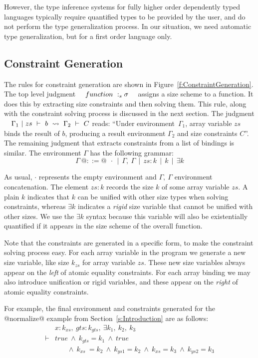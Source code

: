 However, the type inference systems for fully higher order dependently typed languages typically require quantified types to be provided by the user, and do not perform the type generalization process. In our situation, we need automatic type generalization, but for a first order language only.


\subsection{Constraint Generation}
The rules for constraint generation are shown in Figure~\ref{f:ConstraintGeneration}. The top level judgment ~~$function ~:_{s} \sigma$~~ assigns a size scheme to a function. It does this by extracting size constraints and then solving them. This rule, along with the constraint solving process is discussed in the next section. The judgment ~~$\Gamma_1 ~|~ zs ~\vdash~ b ~\leadsto~ \Gamma_2 ~\vdash~ C$ reads: ``Under environment~$\Gamma_1$, array variable $zs$ binds the result of $b$, producing a result environment $\Gamma_2$ and size constraints $C$''. The remaining judgment that extracts constraints from a list of bindings is similar. The environment $\Gamma$ has the following grammar:
$$
\Gamma~ @::=@ ~~\cdot ~~|~~ \Gamma,~ \Gamma ~~|~~ zs : k ~~|~~ k ~~|~~ \exists k
$$

As usual, $\cdot$ represents the empty environment and  $\Gamma,~ \Gamma$
environment concatenation. The element $zs : k$ records the size $k$ of some
array variable $zs$. A plain $k$ indicates that $k$ can be unified with other
size types when solving constraints, whereas $\exists k$ indicates a  \emph{rigid} size variable that cannot be unified with other sizes. We use the $\exists k$ syntax because this variable will also be existentially quantified if it appears in the size scheme of the overall function.

Note that the constraints are generated in a specific form, to make the constraint solving process easy. For each array variable in the program we generate a new size variable, like size $k_{zs}$ for array variable $zs$. These new size variables always appear on the \emph{left} of atomic equality constraints. For each array binding we may also introduce unification or rigid variables, and these appear on the \emph{right} of atomic equality constraints.

For example, the final environment and constraints generated for the @normalize@ example from Section~\ref{s:Introduction} are as follows:
$$
\begin{array}{ll}
       & x : k_{xs},~ gts : k_{gts},~ \exists k_1,~ k_2,~ k_3 
\\
\vdash & true 
        ~\wedge~  k_{gts} = k_1
        ~\wedge~  true
\\     &~~~~~~~~ 
          \wedge~  k_{xs}  ~= k_2
        ~ \wedge~  k_{ys1}  = k_2 
        ~ \wedge~  k_{xs}   = k_3
        ~ \wedge~  k_{ys2}  = k_3
\end{array}
$$



